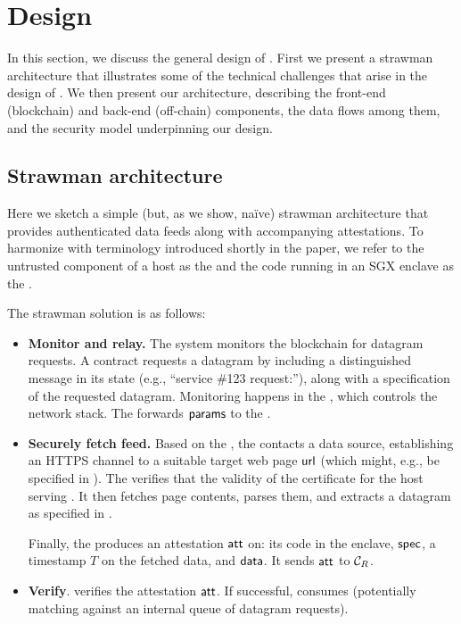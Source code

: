 \section{\tc Design}

In this section, we discuss the general design of \tc. First we present a strawman architecture that illustrates some of the technical challenges that arise in the design of \tc. We then present our \tc architecture, describing the front-end (blockchain) and back-end (off-chain) components, the data flows among them, and the security model underpinning our design.

\subsection{Strawman architecture}

Here we sketch a simple (but, as we show, na\"{i}ve) strawman architecture that provides authenticated data feeds along with accompanying attestations. To harmonize with terminology introduced shortly in the paper, we refer to the untrusted component of a \tc host as the \medname and the code running in an SGX enclave as the \encname.

The strawman solution is as follows:

\begin{itemize}[leftmargin=5mm]
\item
{\bf Monitor and relay.}
The \tc system
monitors the blockchain for 
datagram requests. A contract \reqcont 
requests a datagram by including a distinguished message in its state (e.g., ``\tc service \#123 request:''), along with
a specification \dgform of the requested datagram.
Monitoring happens in the \medname, which controls the network stack. The
\medname forwards ${\sf params}$ 
to the \encname.
\item
{\bf Securely fetch feed.}
Based on the \dgform, the \encname contacts a data source, establishing an HTTPS channel to a suitable target web page ${{\sf url}}$ (which might, e.g., be specified in \dgform). 
The \encname verifies that the validity of the certificate for the host serving \weburl.
It then fetches page contents, parses them, and extracts a datagram \dgm as specified in \dgform.

Finally, the \encname produces an attestation ${\sf att}$ on: its code in the enclave, ${\sf spec}$, a timestamp $T$ on the fetched data, and ${\sf data}$. 
It sends ${\sf att}$ to ${\cal C}_R$.
\item
{\bf Verify}.
\reqcont verifies the attestation ${\sf att}$. If successful, \reqcont consumes \dgm (potentially matching \dgform against an internal queue of datagram requests).
\end{itemize}

